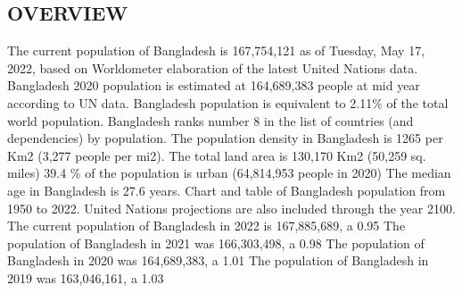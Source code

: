 \documentclass[a4paper,12pt]{article}
\begin{document}
\subsection{OVERVIEW}
\large
The current population of Bangladesh is 167,754,121 as of Tuesday, May 17, 2022, based on Worldometer elaboration of the latest United Nations data.
Bangladesh 2020 population is estimated at 164,689,383 people at mid year according to UN data.
Bangladesh population is equivalent to 2.11\% of the total world population.
Bangladesh ranks number 8 in the list of countries (and dependencies) by population.
The population density in Bangladesh is 1265 per Km2 (3,277 people per mi2).
The total land area is 130,170 Km2 (50,259 sq. miles)
39.4 \% of the population is urban (64,814,953 people in 2020)
The median age in Bangladesh is 27.6 years.
\newline
Chart and table of Bangladesh population from 1950 to 2022. United Nations projections are also included through the year 2100.
The current population of Bangladesh in 2022 is 167,885,689, a 0.95%
The population of Bangladesh in 2021 was 166,303,498, a 0.98%
The population of Bangladesh in 2020 was 164,689,383, a 1.01%
The population of Bangladesh in 2019 was 163,046,161, a 1.03%
\end{document}
